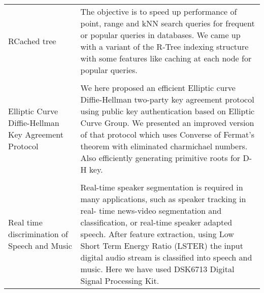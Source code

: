 \documentclass[8pt]{article}
\begin{document}
\begin{tabular}[t]{@{}p{\textwidth-\rcollength-130pt}p{\rcollength+130pt}}
       \\
   RCached tree & The objective is to speed up performance of point, range and kNN search queries for frequent or popular queries in databases. We came up with a variant of the R-Tree indexing structure with some features like caching at each node for popular queries.\\ 
       \\
Elliptic Curve Diffie-Hellman Key Agreement Protocol    & We here proposed an efficient Elliptic curve Diffie-Hellman two-party key agreement protocol using public key authentication based on Elliptic Curve Group. We presented an improved version of that protocol which uses Converse of Fermat’s theorem with eliminated charmichael numbers. Also efficiently generating primitive roots for D-H key.\\
       \\
Real time discrimination of Speech and Music & Real-time speaker segmentation is required in many applications, such as speaker tracking in real- time news-video segmentation and classification, or real-time speaker adapted speech. After feature extraction, using Low Short Term Energy Ratio (LSTER) the input digital audio stream is classified into speech and music. Here we have used DSK6713 Digital Signal Processing Kit.\\

\end{tabular}
\end{document}
